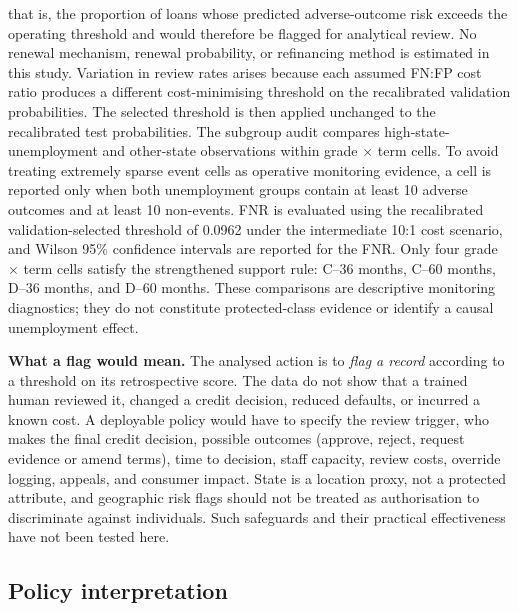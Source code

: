 \documentclass[10pt]{article}
\begin{document}
that is, the proportion of loans whose predicted adverse-outcome risk exceeds the operating threshold and would therefore be flagged for analytical review. No renewal mechanism, renewal probability, or refinancing method is estimated in this study. Variation in review rates arises because each assumed FN:FP cost ratio produces a different cost-minimising threshold on the recalibrated validation probabilities. The selected threshold is then applied unchanged to the recalibrated test probabilities. The subgroup audit compares high-state-unemployment and other-state observations within grade $\times$ term cells. To avoid treating extremely sparse event cells as operative monitoring evidence, a cell is reported only when both unemployment groups contain at least 10 adverse outcomes and at least 10 non-events. FNR is evaluated using the recalibrated validation-selected threshold of 0.0962 under the intermediate 10:1 cost scenario, and Wilson 95\% confidence intervals are reported for the FNR. Only four grade $\times$ term cells satisfy the strengthened support rule: C--36 months, C--60 months, D--36 months, and D--60 months. These comparisons are descriptive monitoring diagnostics; they do not constitute protected-class evidence or identify a causal unemployment effect.

\noindent\textbf{What a flag would mean.} The analysed action is to \emph{flag a record} according to a threshold on its retrospective score. The data do not show that a trained human reviewed it, changed a credit decision, reduced defaults, or incurred a known cost. A deployable policy would have to specify the review trigger, who makes the final credit decision, possible outcomes (approve, reject, request evidence or amend terms), time to decision, staff capacity, review costs, override logging, appeals, and consumer impact. State is a location proxy, not a protected attribute, and geographic risk flags should not be treated as authorisation to discriminate against individuals. Such safeguards and their practical effectiveness have not been tested here.

\subsection{Policy interpretation}
\end{document}
